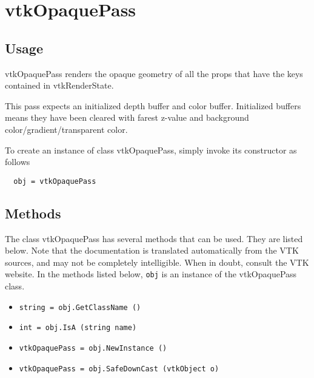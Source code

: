 \section{vtkOpaquePass}

\subsection{Usage}

 vtkOpaquePass renders the opaque geometry of all the props that have the
 keys contained in vtkRenderState.

 This pass expects an initialized depth buffer and color buffer.
 Initialized buffers means they have been cleared with farest z-value and
 background color/gradient/transparent color.
 

To create an instance of class vtkOpaquePass, simply
invoke its constructor as follows
\begin{verbatim}
  obj = vtkOpaquePass
\end{verbatim}
\subsection{Methods}

The class vtkOpaquePass has several methods that can be used.
  They are listed below.
Note that the documentation is translated automatically from the VTK sources,
and may not be completely intelligible.  When in doubt, consult the VTK website.
In the methods listed below, \verb|obj| is an instance of the vtkOpaquePass class.
\begin{itemize}
\item  \verb|string = obj.GetClassName ()|

\item  \verb|int = obj.IsA (string name)|

\item  \verb|vtkOpaquePass = obj.NewInstance ()|

\item  \verb|vtkOpaquePass = obj.SafeDownCast (vtkObject o)|

\end{itemize}
